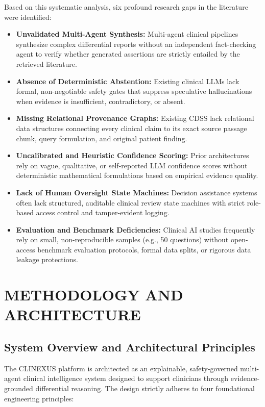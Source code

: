 \documentclass[12pt,a4paper]{report}
\begin{document}
Based on this systematic analysis, six profound research gaps in the literature were identified:
\begin{itemize}
    \item[\textbf{G1.}] \textbf{Unvalidated Multi-Agent Synthesis:} Multi-agent clinical pipelines synthesize complex differential reports without an independent fact-checking agent to verify whether generated assertions are strictly entailed by the retrieved literature.
    \item[\textbf{G2.}] \textbf{Absence of Deterministic Abstention:} Existing clinical LLMs lack formal, non-negotiable safety gates that suppress speculative hallucinations when evidence is insufficient, contradictory, or absent.
    \item[\textbf{G3.}] \textbf{Missing Relational Provenance Graphs:} Existing CDSS lack relational data structures connecting every clinical claim to its exact source passage chunk, query formulation, and original patient finding.
    \item[\textbf{G4.}] \textbf{Uncalibrated and Heuristic Confidence Scoring:} Prior architectures rely on vague, qualitative, or self-reported LLM confidence scores without deterministic mathematical formulations based on empirical evidence quality.
    \item[\textbf{G5.}] \textbf{Lack of Human Oversight State Machines:} Decision assistance systems often lack structured, auditable clinical review state machines with strict role-based access control and tamper-evident logging.
    \item[\textbf{G6.}] \textbf{Evaluation and Benchmark Deficiencies:} Clinical AI studies frequently rely on small, non-reproducible samples (e.g., 50 questions) without open-access benchmark evaluation protocols, formal data splits, or rigorous data leakage protections.
\end{itemize}

\chapter{METHODOLOGY AND ARCHITECTURE}

\section{System Overview and Architectural Principles}
The CLINEXUS platform is architected as an explainable, safety-governed multi-agent clinical intelligence system designed to support clinicians through evidence-grounded differential reasoning. The design strictly adheres to four foundational engineering principles:
\end{document}
